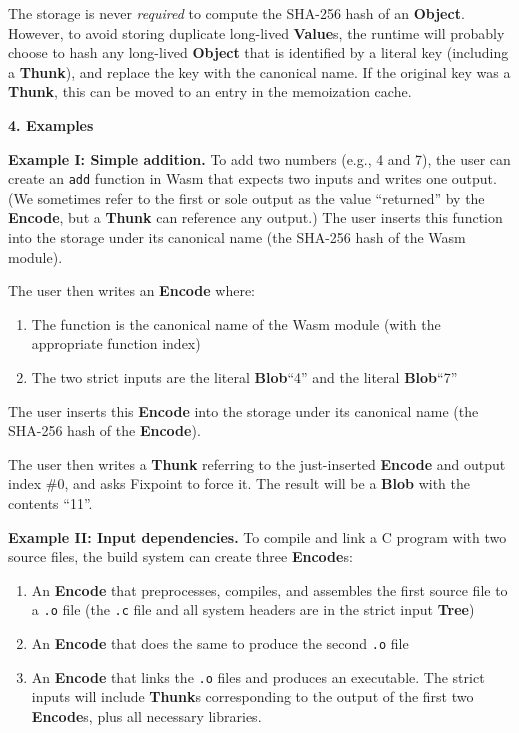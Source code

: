 \documentclass{article}
\newcommand{\blob}{\textbf{Blob}\xspace}
\newcommand{\valuexs}{\textbf{Value}s\xspace}
\newcommand{\object}{\textbf{Object}\xspace}
\newcommand{\encode}{\textbf{Encode}\xspace}
\newcommand{\thunk}{\textbf{Thunk}\xspace}
\newcommand{\thunks}{\textbf{Thunk}s\xspace}
\newcommand{\encodes}{\textbf{Encode}s\xspace}
\newcommand{\tree}{\textbf{Tree}\xspace}
\begin{document}
The storage is never \emph{required} to compute the SHA-256 hash of an
\object. However, to avoid storing duplicate long-lived \valuexs, the
runtime will probably choose to hash any long-lived \object that is
identified by a literal key (including a \thunk), and replace the key
with the canonical name. If the original key was a \thunk, this can be
moved to an entry in the memoization cache.

\vspace{0.5\baselineskip}
{\Large \textbf{4. Examples}}

\textbf{Example I: Simple addition.} To add two numbers (e.g., 4 and
7), the user can create an \texttt{add} function in Wasm that expects
two inputs and writes one output. (We sometimes refer to the first or
sole output as the value ``returned'' by the \encode, but a \thunk can
reference any output.)  The user inserts this function into the
storage under its canonical name (the SHA-256 hash of the Wasm
module).

The user then writes an \encode where:
\begin{enumerate}[topsep=0pt]
\item The function is the canonical name of the Wasm module (with the appropriate function index)
\item The two strict inputs are the literal \blob ``4'' and the literal \blob ``7''
\end{enumerate}
The user inserts this \encode into the storage under its canonical
name (the SHA-256 hash of the \encode).

The user then writes a \thunk referring to the just-inserted \encode and output index \#0, and asks Fixpoint
to force it. The result will be a \blob with the contents ``11''.

\textbf{Example II: Input dependencies.} To compile and link a C program with two source files,
the build system can create three \encodes:
\begin{enumerate}[topsep=0pt]
\item An \encode that preprocesses, compiles, and assembles the first source file to a \texttt{.o} file
  (the \texttt{.c} file and all system headers are in the strict input \tree)
\item An \encode that does the same to produce the second \texttt{.o} file
\item An \encode that links the \texttt{.o} files and produces an executable. The strict inputs will include \thunks corresponding to the output of the first two \encodes, plus all necessary libraries.
\end{enumerate}
\end{document}

